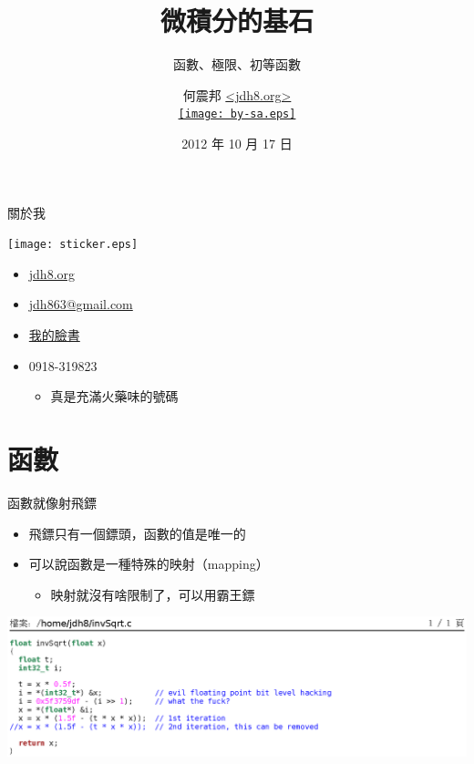 \documentclass{beamer}
\begin{document}
\begin{CJK}{UTF8}{bsmi}
\title{微積分的基石}
\subtitle{函數、極限、初等函數}
\author[何震邦]{何震邦 \href{http://jdh8.org/}{\textless jdh8.org\textgreater}\\
    \href{http://creativecommons.org/licenses/by-sa/3.0/tw/deed.zh\textunderscore TW}{\texttt{[image: by-sa.eps]}}}
\date{2012 年 10 月 17 日}
\maketitle

\begin{frame}{關於我}
  \begin{center}
    \texttt{[image: sticker.eps]}
  \end{center}
  \begin{itemize}
    \item \href{http://jdh8.org/}{jdh8.org}
    \item \href{mailto:jdh863@gmail.com}{jdh863@gmail.com}
    \item \href{http://www.facebook.com/jdh8.fr}{我的臉書}
    \item 0918-319823
      \begin{itemize}
	\item 真是充滿火藥味的號碼
      \end{itemize}
  \end{itemize}
\end{frame}

\section{函數}
\begin{frame}{函數就像射飛鏢}
  \begin{itemize}
    \item 飛鏢只有一個鏢頭，函數的值是唯一的
    \item 可以說函數是一種特殊的映射（mapping）
    \begin{itemize}
      \item 映射就沒有啥限制了，可以用霸王鏢
    \end{itemize}
  \end{itemize}
  \begin{center}
    \includegraphics[width=\textwidth]{invSqrt.ps}
  \end{center}
\end{frame}


\end{CJK}
\end{document}

